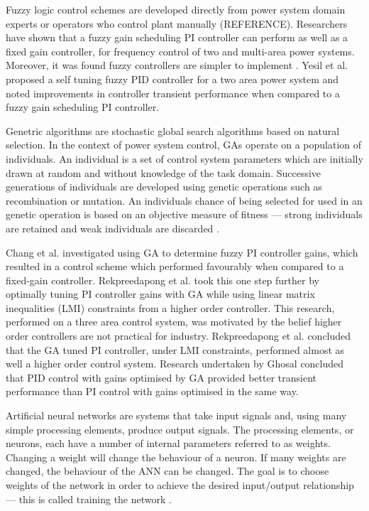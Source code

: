 Fuzzy logic control schemes are developed directly from power system domain experts or operators who control plant manually (REFERENCE). Researchers have shown that a fuzzy gain scheduling PI controller can perform as well as a fixed gain controller, for frequency control of two and multi-area power systems. Moreover, it was found fuzzy controllers are simpler to implement \cite{Chang1997, Cam2005}. Yesil et al. \cite{Yesil2004} proposed a self tuning fuzzy PID controller for a two area power system and noted improvements in controller transient performance when compared to a fuzzy gain scheduling PI controller.

Genetric algorithms are stochastic global search algorithms based on natural selection. In the context of power system control, GAs operate on a population of individuals. An individual is a set of control system parameters which are initially drawn at random and without knowledge of the task domain. Successive generations of individuals are developed using genetic operations such as recombination or mutation. An individuals chance of being selected for used in an genetic operation is based on an objective measure of fitness --- strong individuals are retained and weak individuals are discarded \cite{Fleming1993}.

Chang et al. \cite{Chang1998} investigated using GA to determine fuzzy PI controller gains, which resulted in a control scheme which performed favourably when compared to a fixed-gain controller. Rekpreedapong et al. \cite{Rerkpreedapong2003} took this one step further by optimally tuning PI controller gains with GA while using linear matrix inequalities (LMI) constraints from a higher order controller. This research, performed on a three area control system, was motivated by the belief higher order controllers are not practical for industry. Rekpreedapong et al. concluded that the GA tuned PI controller, under LMI constraints, performed almost as well a higher order control system. Research undertaken by Ghosal \cite{Ghoshal2004} concluded that PID control with gains optimised by GA provided better transient performance than PI control with gains optimised in the same way.

Artificial neural networks are systems that take input signals and, using many simple processing elements, produce output signals. The processing elements, or neurons, each have a number of internal parameters referred to as weights. Changing a weight will change the behaviour of a neuron. If many weights are changed, the behaviour of the ANN can be changed. The goal is to choose weights of the network in order to achieve the desired input/output relationship --- this is called training the network \cite{Nguyen1990}.

